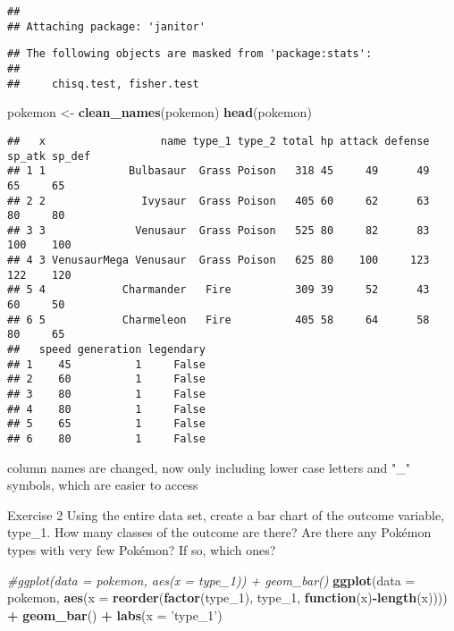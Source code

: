 \documentclass[]{article}
\newenvironment{Shaded}{\begin{snugshade}}{\end{snugshade}}
\newcommand{\CommentTok}[1]{\textcolor[rgb]{0.56,0.35,0.01}{\textit{#1}}}
\newcommand{\ControlFlowTok}[1]{\textcolor[rgb]{0.13,0.29,0.53}{\textbf{#1}}}
\newcommand{\DataTypeTok}[1]{\textcolor[rgb]{0.13,0.29,0.53}{#1}}
\newcommand{\DecValTok}[1]{\textcolor[rgb]{0.00,0.00,0.81}{#1}}
\newcommand{\KeywordTok}[1]{\textcolor[rgb]{0.13,0.29,0.53}{\textbf{#1}}}
\newcommand{\NormalTok}[1]{#1}
\newcommand{\OperatorTok}[1]{\textcolor[rgb]{0.81,0.36,0.00}{\textbf{#1}}}
\newcommand{\StringTok}[1]{\textcolor[rgb]{0.31,0.60,0.02}{#1}}
\begin{document}
\begin{verbatim}
## 
## Attaching package: 'janitor'
\end{verbatim}

\begin{verbatim}
## The following objects are masked from 'package:stats':
## 
##     chisq.test, fisher.test
\end{verbatim}

\begin{Shaded}
\begin{Highlighting}[]
\NormalTok{pokemon <-}\StringTok{ }\KeywordTok{clean_names}\NormalTok{(pokemon)}
\KeywordTok{head}\NormalTok{(pokemon)}
\end{Highlighting}
\end{Shaded}

\begin{verbatim}
##   x                  name type_1 type_2 total hp attack defense sp_atk sp_def
## 1 1             Bulbasaur  Grass Poison   318 45     49      49     65     65
## 2 2               Ivysaur  Grass Poison   405 60     62      63     80     80
## 3 3              Venusaur  Grass Poison   525 80     82      83    100    100
## 4 3 VenusaurMega Venusaur  Grass Poison   625 80    100     123    122    120
## 5 4            Charmander   Fire          309 39     52      43     60     50
## 6 5            Charmeleon   Fire          405 58     64      58     80     65
##   speed generation legendary
## 1    45          1     False
## 2    60          1     False
## 3    80          1     False
## 4    80          1     False
## 5    65          1     False
## 6    80          1     False
\end{verbatim}

column names are changed, now only including lower case letters and "\_"
symbols, which are easier to access

Exercise 2 Using the entire data set, create a bar chart of the outcome
variable, type\_1. How many classes of the outcome are there? Are there
any Pokémon types with very few Pokémon? If so, which ones?

\begin{Shaded}
\begin{Highlighting}[]
\CommentTok{#ggplot(data = pokemon, aes(x = type_1)) + geom_bar()}
\KeywordTok{ggplot}\NormalTok{(}\DataTypeTok{data =}\NormalTok{ pokemon, }\KeywordTok{aes}\NormalTok{(}\DataTypeTok{x =} \KeywordTok{reorder}\NormalTok{(}\KeywordTok{factor}\NormalTok{(type_}\DecValTok{1}\NormalTok{), type_}\DecValTok{1}\NormalTok{, }\ControlFlowTok{function}\NormalTok{(x)}\OperatorTok{-}\KeywordTok{length}\NormalTok{(x)))) }\OperatorTok{+}\StringTok{ }\KeywordTok{geom_bar}\NormalTok{() }\OperatorTok{+}\StringTok{ }\KeywordTok{labs}\NormalTok{(}\DataTypeTok{x =} \StringTok{'type_1'}\NormalTok{)}
\end{Highlighting}
\end{Shaded}
\end{document}
